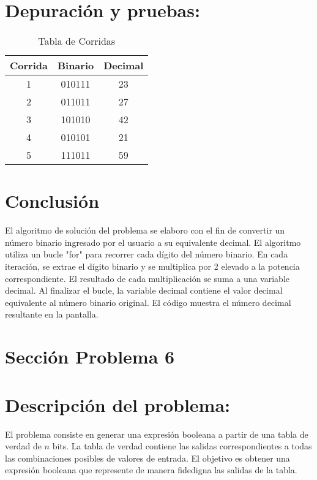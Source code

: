 \documentclass{IEEEcsmag}
\begin{document}
\section*{Depuración y pruebas:}
 
 \begin{table}[h]
     \centering
     \caption{Tabla de Corridas}
     
     \begin{tabular}{|c|c|c|}
     \hline
        Corrida & Binario & Decimal\\
        \hline
        1  & 010111 & 23\\
        \hline
        2  & 011011 & 27\\
        \hline
        3  & 101010 & 42\\
        \hline
        4  & 010101 & 21\\
        \hline
        5  & 111011 & 59\\
        \hline
     \end{tabular}
     \label{tab:my_label}
 \end{table}

\section*{Conclusión}
El algoritmo de solución del problema se elaboro con el fin de convertir un número binario ingresado por el usuario a su equivalente decimal. El algoritmo utiliza un bucle "for" para recorrer cada dígito del número binario. En cada iteración, se extrae el dígito binario y se multiplica por 2 elevado a la potencia correspondiente. El resultado de cada multiplicación se suma a una variable decimal. Al finalizar el bucle, la variable decimal contiene el valor decimal equivalente al número binario original. El código muestra el número decimal resultante en la pantalla.
\newpage





\section{Sección Problema 6}
\section*{Descripción del problema:}

El problema consiste en generar una expresión booleana a partir de una tabla de verdad de \(n\) bits. La tabla de verdad contiene las salidas correspondientes a todas las combinaciones posibles de valores de entrada. El objetivo es obtener una expresión booleana que represente de manera fidedigna las salidas de la tabla.
\end{document}
